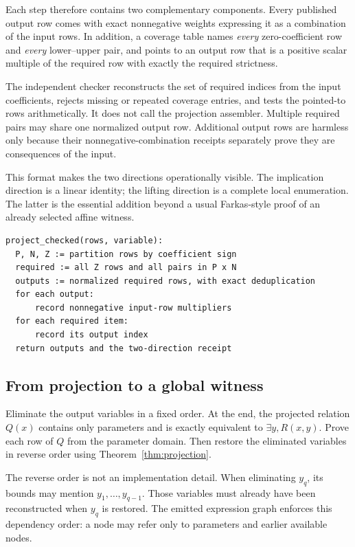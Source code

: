 Each step therefore contains two complementary components. Every published output row comes with exact nonnegative weights expressing it as a combination of the input rows. In addition, a coverage table names \emph{every} zero-coefficient row and \emph{every} lower--upper pair, and points to an output row that is a positive scalar multiple of the required row with exactly the required strictness.

The independent checker reconstructs the set of required indices from the input coefficients, rejects missing or repeated coverage entries, and tests the pointed-to rows arithmetically. It does not call the projection assembler. Multiple required pairs may share one normalized output row. Additional output rows are harmless only because their nonnegative-combination receipts separately prove they are consequences of the input.

This format makes the two directions operationally visible. The implication direction is a linear identity; the lifting direction is a complete local enumeration. The latter is the essential addition beyond a usual Farkas-style proof of an already selected affine witness.

\par\noindent\begin{minipage}{\linewidth}
\begin{lstlisting}
project_checked(rows, variable):
  P, N, Z := partition rows by coefficient sign
  required := all Z rows and all pairs in P x N
  outputs := normalized required rows, with exact deduplication
  for each output:
      record nonnegative input-row multipliers
  for each required item:
      record its output index
  return outputs and the two-direction receipt
\end{lstlisting}
\end{minipage}\par

\subsection{From projection to a global witness}
Eliminate the output variables in a fixed order. At the end, the projected relation \(Q(x)\) contains only parameters and is exactly equivalent to \(\exists y,R(x,y)\). Prove each row of \(Q\) from the parameter domain. Then restore the eliminated variables in reverse order using Theorem~\ref{thm:projection}.

The reverse order is not an implementation detail. When eliminating \(y_q\), its bounds may mention \(y_1,\ldots,y_{q-1}\). Those variables must already have been reconstructed when \(y_q\) is restored. The emitted expression graph enforces this dependency order: a node may refer only to parameters and earlier available nodes.

